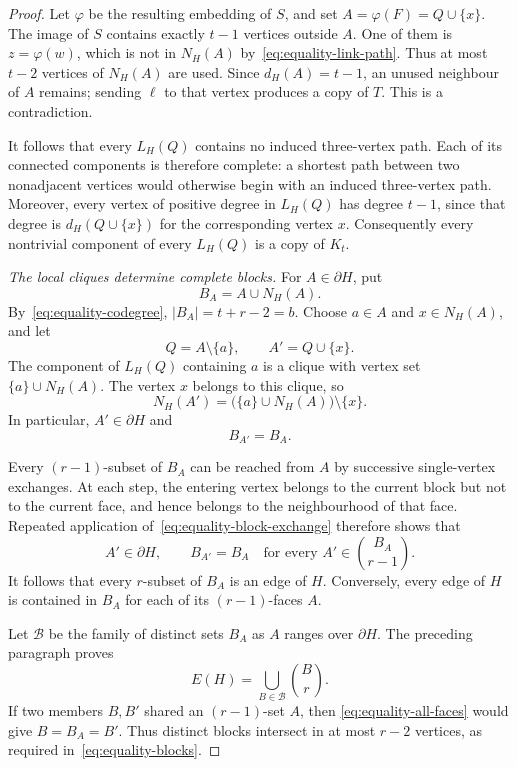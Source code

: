 \documentclass[11pt]{article}
\theoremstyle{remark}
\numberwithin{equation}{section}
\newcommand{\sh}{\partial}
\begin{document}
\begin{proof}
		\bigskip
		
		Let $\varphi$ be the resulting embedding of $S$, and set
		$A=\varphi(F)=Q\cup\{x\}$. The image of $S$ contains exactly
		$t-1$ vertices outside $A$. One of them is $z=\varphi(w)$,
		which is not in $N_H(A)$ by~\eqref{eq:equality-link-path}.
		Thus at most $t-2$ vertices of $N_H(A)$ are used. Since
		$d_H(A)=t-1$, an unused neighbour of $A$ remains; sending
		$\ell$ to that vertex produces a copy of $T$. This is a
		contradiction.
		
		\bigskip
		
		It follows that every $L_H(Q)$ contains no induced
		three-vertex path. Each of its connected components is
		therefore complete: a shortest path between two nonadjacent
		vertices would otherwise begin with an induced three-vertex
		path. Moreover, every vertex of positive degree in $L_H(Q)$
		has degree $t-1$, since that degree is
		$d_H(Q\cup\{x\})$ for the corresponding vertex $x$.
		Consequently every nontrivial component of every $L_H(Q)$
		is a copy of $K_t$.
		
		\medskip\noindent
		\emph{The local cliques determine complete blocks.}
		For $A\in\sh H$, put
		\[
		B_A=A\cup N_H(A).
		\]
		By~\eqref{eq:equality-codegree}, $|B_A|=t+r-2=b$.
		Choose $a\in A$ and $x\in N_H(A)$, and let
		\[
		Q=A\setminus\{a\},\qquad A'=Q\cup\{x\}.
		\]
		The component of $L_H(Q)$ containing $a$ is a clique with
		vertex set $\{a\}\cup N_H(A)$. The vertex $x$ belongs to
		this clique, so
		\[
		N_H(A')=
		\bigl(\{a\}\cup N_H(A)\bigr)\setminus\{x\}.
		\]
		In particular, $A'\in\sh H$ and
		\begin{equation}\label{eq:equality-block-exchange}
			B_{A'}=B_A.
		\end{equation}
		
		Every $(r-1)$-subset of $B_A$ can be reached from $A$ by
		successive single-vertex exchanges. At each step, the entering
		vertex belongs to the current block but not to the current
		face, and hence belongs to the neighbourhood of that face.
		Repeated application of~\eqref{eq:equality-block-exchange}
		therefore shows that
		\begin{equation}\label{eq:equality-all-faces}
			A'\in\sh H,\qquad B_{A'}=B_A
			\quad\text{for every }A'\in\binom{B_A}{r-1}.
		\end{equation}
		It follows that every $r$-subset of $B_A$ is an edge of $H$.
		Conversely, every edge of $H$ is contained in $B_A$ for each
		of its $(r-1)$-faces $A$.
		
		Let $\mathcal B$ be the family of distinct sets $B_A$ as
		$A$ ranges over $\sh H$. The preceding paragraph proves
		\[
		E(H)=\bigcup_{B\in\mathcal B}\binom Br.
		\]
		If two members $B,B'$ shared an $(r-1)$-set $A$, then
		\eqref{eq:equality-all-faces} would give $B=B_A=B'$.
		Thus distinct blocks intersect in at most $r-2$ vertices,
		as required in~\eqref{eq:equality-blocks}.
		

\end{proof}
\end{document}

